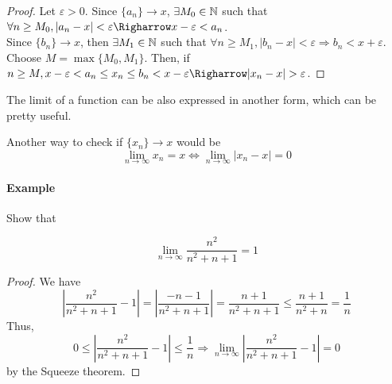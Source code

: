 \begin{proof}
    Let $\varepsilon > 0$. Since $\{a_n\} \to x$, $\exists M_0 \in \mathbb{N}$ such that $\forall n \geq M_0, |a_n-x| < \varepsilon \Righarrow x-\varepsilon < a_n$.\\
    Since $\{b_n\} \to x$, then $\exists M_1 \in \mathbb{N}$ such that $\forall n \geq M_1, |b_n-x|<\varepsilon \Rightarrow b_n < x + \varepsilon$. \\
    Choose $M = \max\{ M_0, M_1\}$. Then, if $n \geq M, x-\varepsilon < a_n \leq x_n \leq b_n < x-\varepsilon \Righarrow |x_n-x|>\varepsilon$.
\end{proof}

The limit of a function can be also expressed in another form, which can be pretty useful.

\begin{theorem}
    Another way to check if $\{x_n\} \to x$ would be
    \begin{equation*}
        \lim \limits_{n \to \infty} x_n = x \Longleftrightarrow \lim \limits_{n \to \infty} |x_n - x| = 0
    \end{equation*}
\end{theorem}

\paragraph{Example}

Show that 

\begin{equation*}
    \lim \limits_{n \to \infty} \frac{n^2}{n^2+n+1} = 1
\end{equation*}

\begin{proof}
    We have
    \begin{equation*}
        \left |
            \frac{n^2}{n^2+n+1} - 1
        \right | = 
        \left |
            \frac{-n-1}{n^2+n+1}
        \right | = 
        \frac{n+1}{n^2+n+1} \leq
        \frac{n+1}{n^2+n} = \frac{1}{n}
    \end{equation*}
    Thus,
    \begin{equation*}
        0 \leq 
        \left |
            \frac{n^2}{n^2+n+1} - 1
        \right |
        \leq
        \frac{1}{n}
        \Longrightarrow
        \lim \limits_{n \to \infty}
        \left |
            \frac{n^2}{n^2+n+1} - 1
        \right | = 0
    \end{equation*}
    by the Squeeze theorem.
\end{proof}

